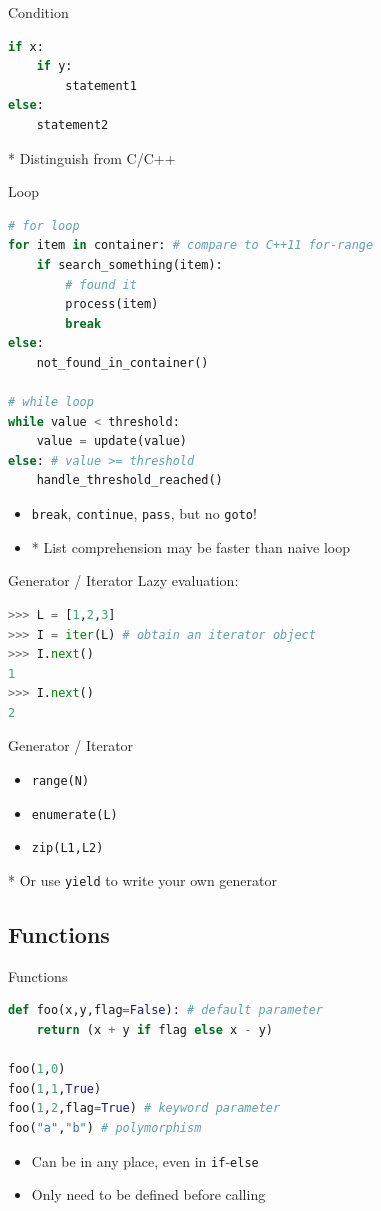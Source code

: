 \documentclass{../TexTemplate/myslide}
\begin{document}
\begin{frame}[fragile]{Condition}
\begin{lstlisting}[language=python]
if x:
    if y:
        statement1
else:
    statement2
\end{lstlisting}
* Distinguish from C/C++
\end{frame}

\begin{frame}[fragile]{Loop}
\begin{lstlisting}[language=python]
# for loop
for item in container: # compare to C++11 for-range
    if search_something(item):
        # found it
        process(item)
        break
else:
    not_found_in_container()

# while loop
while value < threshold:
    value = update(value)
else: # value >= threshold
    handle_threshold_reached()
\end{lstlisting}
\begin{itemize}
\item \verb'break', \verb'continue', \verb'pass', but no \verb'goto'!
\item * List comprehension may be faster than naive loop
\end{itemize}
\end{frame}

\begin{frame}[fragile]{Generator / Iterator}
Lazy evaluation:
\begin{lstlisting}[language=python]
>>> L = [1,2,3]
>>> I = iter(L) # obtain an iterator object
>>> I.next()
1
>>> I.next()
2
\end{lstlisting}
\end{frame}

\begin{frame}[fragile]{Generator / Iterator}
\begin{itemize}
\item \verb'range(N)'
\item \verb'enumerate(L)'
\item \verb'zip(L1,L2)'
\end{itemize}
* Or use \verb'yield' to write your own generator
\end{frame}

\subsection{Functions}
\begin{frame}[fragile]{Functions}
\begin{lstlisting}[language=python]
def foo(x,y,flag=False): # default parameter
    return (x + y if flag else x - y)

foo(1,0)
foo(1,1,True)
foo(1,2,flag=True) # keyword parameter
foo("a","b") # polymorphism
\end{lstlisting}
\begin{itemize}
	\item Can be in any place, even in \verb'if'-\verb'else'
	\item Only need to be defined before calling
\end{itemize}
\end{frame}
\end{document}
